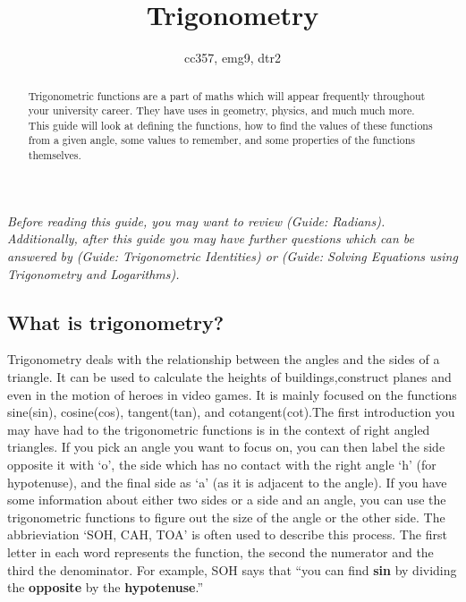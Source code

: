 \documentclass[
  12pt,
  a4paper, oneside]{starmastarticle}
\title{Trigonometry}
\author{cc357, emg9, dtr2}
\date{}
\begin{document}
\maketitle
\begin{abstract}
Trigonometric functions are a part of maths which will appear frequently
throughout your university career. They have uses in geometry, physics,
and much much more. This guide will look at defining the functions, how
to find the values of these functions from a given angle, some values to
remember, and some properties of the functions themselves.
\end{abstract}
\ifdefined\Shaded\renewenvironment{Shaded}{\begin{tcolorbox}[frame hidden, breakable, borderline west={3pt}{0pt}{shadecolor}, boxrule=0pt, enhanced, sharp corners, interior hidden]}{\end{tcolorbox}}\fi

\emph{Before reading this guide, you may want to review (Guide:
Radians). Additionally, after this guide you may have further questions
which can be answered by (Guide: Trigonometric Identities) or (Guide:
Solving Equations using Trigonometry and Logarithms).}

\hypertarget{what-is-trigonometry}{%
\subsection{What is trigonometry?}\label{what-is-trigonometry}}

Trigonometry deals with the relationship between the angles and the
sides of a triangle. It can be used to calculate the heights of
buildings,construct planes and even in the motion of heroes in video
games. It is mainly focused on the functions sine(sin), cosine(cos),
tangent(tan), and cotangent(cot).The first introduction you may have had
to the trigonometric functions is in the context of right angled
triangles. If you pick an angle you want to focus on, you can then label
the side opposite it with `o', the side which has no contact with the
right angle `h' (for hypotenuse), and the final side as `a' (as it is
adjacent to the angle). If you have some information about either two
sides or a side and an angle, you can use the trigonometric functions to
figure out the size of the angle or the other side. The abbrieviation
`SOH, CAH, TOA' is often used to describe this process. The first letter
in each word represents the function, the second the numerator and the
third the denominator. For example, SOH says that ``you can find
\textbf{sin} by dividing the \textbf{opposite} by the
\textbf{hypotenuse}.''
\end{document}

